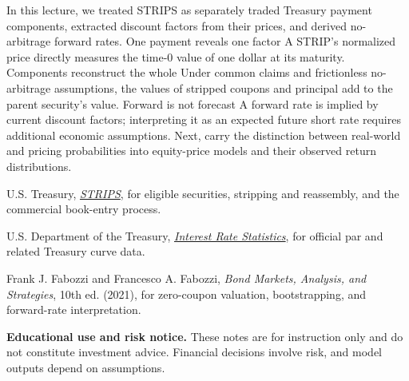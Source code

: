 \documentclass[11pt]{article}
\begin{document}
\newpage
\thispagestyle{fancy}
\keytakeaways
  {In this lecture, we treated STRIPS as separately traded Treasury payment components, extracted discount factors from their prices, and derived no-arbitrage forward rates.}
  {One payment reveals one factor}
  {A STRIP's normalized price directly measures the time-0 value of one dollar at its maturity.}
  {Components reconstruct the whole}
  {Under common claims and frictionless no-arbitrage assumptions, the values of stripped coupons and principal add to the parent security's value.}
  {Forward is not forecast}
  {A forward rate is implied by current discount factors; interpreting it as an expected future short rate requires additional economic assumptions.}
  {Next, carry the distinction between real-world and pricing probabilities into equity-price models and their observed return distributions.}

\begin{readinglist}
  \item U.S. Treasury, \href{https://www.treasurydirect.gov/marketable-securities/strips/}{\emph{STRIPS}}, for eligible securities, stripping and reassembly, and the commercial book-entry process.
  \item U.S. Department of the Treasury, \href{https://home.treasury.gov/resource-center/data-chart-center/interest-rates}{\emph{Interest Rate Statistics}}, for official par and related Treasury curve data.
  \item Frank J. Fabozzi and Francesco A. Fabozzi, \emph{Bond Markets, Analysis, and Strategies}, 10th ed. (2021), for zero-coupon valuation, bootstrapping, and forward-rate interpretation.
\end{readinglist}

\vfill
{\sffamily\footnotesize\color{vnmuted}\textbf{Educational use and risk notice.} These notes are for instruction only and do not constitute investment advice. Financial decisions involve risk, and model outputs depend on assumptions.}
\end{document}
